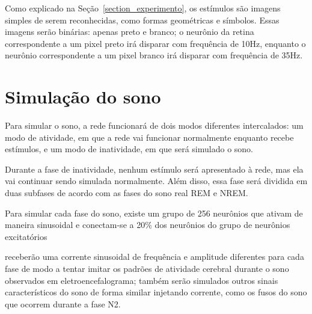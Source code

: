 Como explicado na Seção~\ref{section_experimento}, os estímulos são imagens simples de serem reconhecidas, como formas
geométricas e símbolos. Essas imagens serão binárias: apenas preto e branco; o neurônio da retina correspondente a um pixel preto
irá disparar com frequência de 10Hz, enquanto o neurônio correspondente a um pixel branco irá disparar com frequência de 35Hz.

\section{Simulação do sono}

Para simular o sono, a rede funcionará de dois modos diferentes intercalados: um modo de atividade, em que a rede vai funcionar
normalmente enquanto recebe estímulos, e um modo de inatividade, em que será simulado o sono. 

Durante a fase de inatividade, nenhum estímulo será apresentado à rede, mas ela vai continuar sendo simulada normalmente. Além
disso, essa fase será dividida em duas subfases de acordo com as fases do sono real REM e NREM. 


Para simular cada fase do sono, existe um grupo de 256 neurônios que ativam de maneira sinusoidal e conectam-se a 20\% dos
neurônios do grupo de neurônios excitatórios

receberão uma corrente sinusoidal de frequência e amplitude diferentes para cada fase de modo a tentar imitar os padrões de
atividade cerebral durante o sono observados em eletroencefalograma; também serão simulados outros sinais característicos do sono
de forma similar injetando corrente, como os fusos do sono que ocorrem durante a fase N2.




